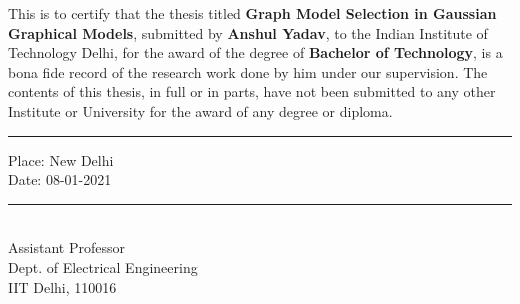 \certificate

\vspace*{0.5in}

This is to certify that the thesis titled {\bf Graph Model Selection in Gaussian Graphical Models}, submitted by {\bf Anshul Yadav}, 
  to the Indian Institute of Technology Delhi, for
the award of the degree of {\bf Bachelor of Technology}, is a bona fide
record of the research work done by him under our supervision.  The
contents of this thesis, in full or in parts, have not been submitted
to any other Institute or University for the award of any degree or
diploma.


\vspace*{1.5in}

\begin{singlespacing}
	\parbox[t]{4cm}{\hrule height 0pt width 0pt
	\noindent Place: New Delhi\\
	\noindent Date: 08-01-2021 \\	
}
\hfill
	\parbox[t]{5.5cm}{\hrule height 0pt width 0pt
		 \\
		\noindent Assistant Professor \\
		\noindent Dept. of Electrical Engineering\\
		\noindent IIT Delhi, 110016 \\
	}

\end{singlespacing}


